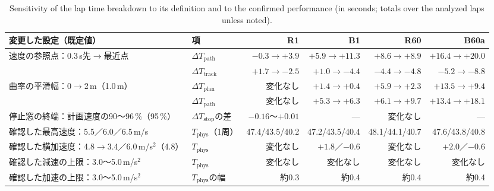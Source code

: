 \begin{table}[!htbp]
  \centering
  \caption[Sensitivity of the lap time breakdown.]{Sensitivity of the lap time breakdown to its definition and to the confirmed performance (in seconds; totals over the analyzed laps unless noted).}
  \label{tab:decomp_sens}
  \footnotesize
  \begin{lrbox}{\tblbox}\setlength{\tabcolsep}{3pt}\begin{tabular}{L{3.2cm}L{1.9cm}rrrr}
    \toprule
    変更した設定（既定値） & 項 & R1 & B1 & R60 & B60a \\
    \midrule
    速度の参照点：0.3\,s先$\to$最近点 & $\Delta T_{\mathrm{path}}$ & $-0.3$$\to$$+3.9$ & $+5.9$$\to$$+11.3$ & $+8.6$$\to$$+8.9$ & $+16.4$$\to$$+20.0$ \\
     & $\Delta T_{\mathrm{track}}$ & $+1.7$$\to$$-2.5$ & $+1.0$$\to$$-4.4$ & $-4.4$$\to$$-4.8$ & $-5.2$$\to$$-8.8$ \\
    曲率の平滑幅：0$\to$2\,m（1.0\,m） & $\Delta T_{\mathrm{plan}}$ & 変化なし & $+1.4$$\to$$+0.4$ & $+5.9$$\to$$+2.3$ & $+13.5$$\to$$+9.4$ \\
     & $\Delta T_{\mathrm{path}}$ & 変化なし & $+5.3$$\to$$+6.3$ & $+6.1$$\to$$+9.7$ & $+13.4$$\to$$+18.1$ \\
    停止窓の終端：計画速度の90〜96\,\%（95\,\%） & $\Delta T_{\mathrm{stop}}$の差 & $-0.16$〜$+0.01$ & --- & 変化なし & --- \\
    確認した最高速度：5.5／6.0／6.5\,m/s & $T_{\mathrm{phys}}$（1周） & 47.4/43.5/40.2 & 47.2/43.5/40.4 & 48.1/44.1/40.7 & 47.6/43.8/40.8 \\
    確認した横加速度：4.8$\to$3.4／6.0\,m/s$^2$（4.8） & $T_{\mathrm{phys}}$ & 変化なし & $+1.8$／$-0.6$ & 変化なし & $+2.0$／$-0.6$ \\
    確認した減速の上限：3.0〜5.0\,m/s$^2$ & $T_{\mathrm{phys}}$ & 変化なし & 変化なし & 変化なし & 変化なし \\
    確認した加速の上限：3.0〜5.0\,m/s$^2$ & $T_{\mathrm{phys}}$の幅 & 約0.3 & 約0.4 & 約0.4 & 約0.4 \\
    \bottomrule
  \end{tabular}\end{lrbox}\usebox{\tblbox}
\end{table}

\clearpage
